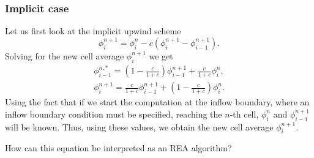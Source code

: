\documentclass[../thesis.tex]{subfiles}
\begin{document}
\subsubsection{Implicit case}
Let us first look at the implicit upwind scheme
\begin{equation}\label{eqn:rea-implicit-upwind-1d}
    \phi_{i}^{n+1} =
    \phi_{i}^{n} - c\left( \phi_{i}^{n+1} - \phi_{i-1}^{n+1} \right).
\end{equation}
Solving for the new cell average \(\phi_{i}^{n+1}\) we get
\begin{equation*}
    \begin{split}
        \phi_{i-1}^{n,*}
        = \left( 1 - \frac{c}{1+c} \right)\phi_{i-1}^{n+1}
        + \frac{c}{1+c}\phi_{i}^{n},
        \\
        \phi_{i}^{n+1}
        = \frac{c}{1+c}\phi_{i-1}^{n+1}
        + \left( 1 - \frac{c}{1+c} \right)\phi_{i}^{n}.
    \end{split}
\end{equation*}
Using the fact that if we start the computation at the inflow boundary, where an inflow boundary condition must be specified, reaching the \(n\)-th cell, \(\phi_{i}^{n}\) and \(\phi_{i-1}^{n+1}\) will be known. Thus, using these values, we obtain the new cell average \(\phi_{i}^{n+1}\).

How can this equation be interpreted as an REA algorithm?
\end{document}
